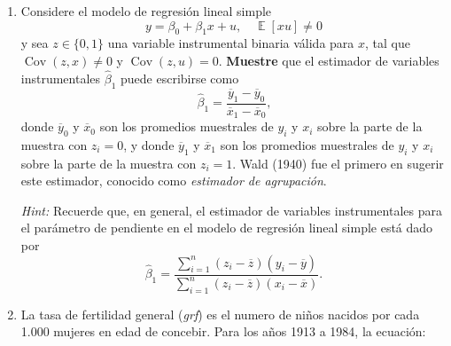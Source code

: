 \documentclass[letterpaper,11pt]{article}
\DeclareMathOperator{\cov}{Cov}
\DeclareMathOperator{\Exp}{\mathbb{E}}
\newcommand{\E}[1]{\Exp\left[#1\right]}
\DeclareMathOperator{\plim}{plim}
\begin{document}
\begin{enumerate}
\begin{enumerate}
\begin{enumerate}[(i)]
        \item El estimador
        $\widehat \sigma = \sqrt{\frac{1}{n - k - 1}\sum\limits_{i=1}^n\widehat u_i^2}$ para la desviación estándar $\sigma = \sqrt{\E{u^2}}$ del término de error en el modelo de regresión lineal múltiple $y = \boldsymbol{x}'\boldsymbol{\beta} + u$ con $\E{u \mid \boldsymbol{x}} = \boldsymbol{0}$, donde $\lbrace \widehat u_i \rbrace_{i=1}^n$ son los residuos de MCO.
        Puede usar los resultados $\plim \widehat \sigma^2 = \sigma^2$ y $\E{\widehat \sigma^2} = \sigma^2$ sin necesidad de demostrar.
                
            \end{enumerate}

        \item  Todo estimador insesgado es necesariamente consistente.
            
            \medskip
            \textit{Hint:}
                Piense en el estimador $\widehat \mu = y_1$ para la media poblacional $\mu = \E{y}$ de la variable aleatoria $y$, donde $y_1$ es la primera observación de la muestra i.i.d. $\lbrace y_i \rbrace_{i=1}^n$.
    
    \end{enumerate}

    \item  Considere el modelo de regresión lineal simple
        $$y=\beta_0+\beta_1x+u,\quad\E{x u}\neq0
        $$
        y sea $z \in \lbrace 0, 1 \rbrace$ una variable instrumental binaria válida para $x$, tal que $\cov{\left( z, x \right)} \neq 0$ y $\cov{\left( z, u \right)} = 0$.
        \textbf{Muestre} que el estimador de variables instrumentales $\widehat \beta_1$ puede escribirse como
        $$\widehat \beta_1=\frac{\overline y_1 -        \overline y_0}{\overline x_1 - \overline x_0}\text{,}$$
        donde $\overline y_0$ y $\overline x_0$ son los promedios muestrales de $y_i$ y $x_i$ sobre la parte de la muestra con $z_i = 0$, y donde $\overline y_1$ y $\overline x_1$ son los promedios muestrales de $y_i$ y $x_i$ sobre la parte de la muestra con $z_i = 1$. 
        Wald (1940) fue el primero en sugerir este estimador, conocido como \textit{estimador de agrupación}.
        
        \smallskip
        \textit{Hint:}
        Recuerde que, en general, el estimador de variables instrumentales para el parámetro de pendiente en el modelo de regresión lineal simple está dado por
        $$\widehat \beta_1=\frac{\sum\limits_{i=1}^n\left(z_i -     \overline z\right)\left(y_i - \overline y            \right)}{\sum\limits_{i=1}^n \left(z_i - \overline z\right) \left(x_i - \overline x \right)}\text{.}$$
\item La tasa de fertilidad general (\textit{grf}) es el numero de niños nacidos por cada 1.000 mujeres en edad de concebir. Para los años 1913 a 1984, la ecuación:


\end{enumerate}
\end{document}

